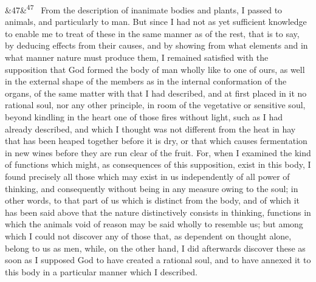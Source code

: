 \documentclass[12pt]{article}
\newcommand{\para}[1][]{\par\noindent\ifx&#1&\else\textsuperscript{\footnotesize #1}~\fi}
\begin{document}
\para[47] From the description of inanimate bodies and plants, I passed to animals, and particularly to man. But since I had not as yet sufficient knowledge to enable me to treat of these in the same manner as of the rest, that is to say, by deducing effects from their causes, and by showing from what elements and in what manner nature must produce them, I remained satisfied with the supposition that God formed the body of man wholly like to one of ours, as well in the external shape of the members as in the internal conformation of the organs, of the same matter with that I had described, and at first placed in it no rational soul, nor any other principle, in room of the vegetative or sensitive soul, beyond kindling in the heart one of those fires without light, such as I had already described, and which I thought was not different from the heat in hay that has been heaped together before it is dry, or that which causes fermentation in new wines before they are run clear of the fruit. For, when I examined the kind of functions which might, as consequences of this supposition, exist in this body, I found precisely all those which may exist in us independently of all power of thinking, and consequently without being in any measure owing to the soul; in other words, to that part of us which is distinct from the body, and of which it has been said above that the nature distinctively consists in thinking, functions in which the animals void of reason may be said wholly to resemble us; but among which I could not discover any of those that, as dependent on thought alone, belong to us as men, while, on the other hand, I did afterwards discover these as soon as I supposed God to have created a rational soul, and to have annexed it to this body in a particular manner which I described.
\end{document}
